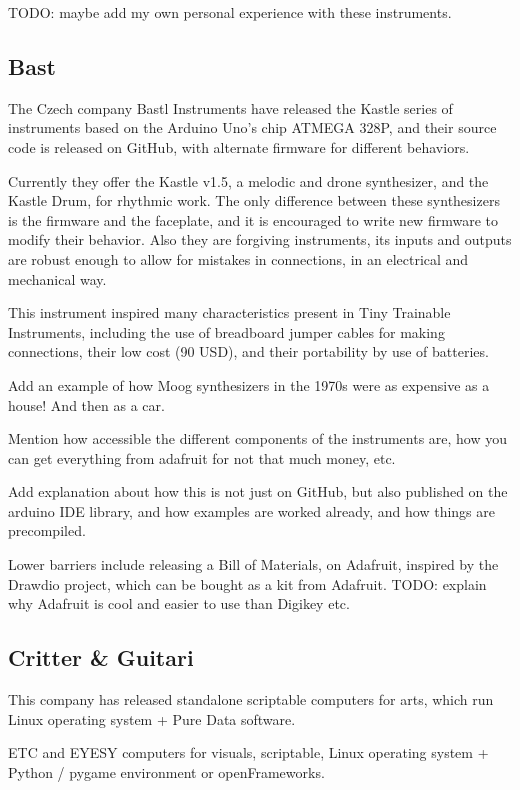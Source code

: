 TODO: maybe add my own personal experience with these instruments.

\subsection{Bast}

The Czech company Bastl Instruments have released the Kastle series of instruments based on the Arduino Uno’s chip ATMEGA 328P, and their source code is released on GitHub, with alternate firmware for different behaviors.

Currently they offer the Kastle v1.5, a melodic and drone synthesizer, and the Kastle Drum, for rhythmic work. The only difference between these synthesizers is the firmware and the faceplate, and it is encouraged to write new firmware to modify their behavior. Also they are forgiving instruments, its inputs and outputs are robust enough to allow for mistakes in connections, in an electrical and mechanical way.

This instrument inspired many characteristics present in Tiny Trainable Instruments, including 
 the use of breadboard jumper cables for making connections, their low cost (90 USD), and their portability by use of batteries.

Add an example of how Moog synthesizers in the 1970s were as expensive as a house!
And then as a car.

Mention how accessible the different components of the instruments are, how you can get everything from adafruit for not that much money, etc.

Add explanation about how this is not just on GitHub, but also published on the arduino IDE library, and how examples are worked already, and how things are precompiled.

Lower barriers include releasing a Bill of Materials, on Adafruit, inspired by the Drawdio project, which can be bought as a kit from Adafruit. TODO: explain why Adafruit is cool and easier to use than Digikey etc.

\subsection{Critter \& Guitari}

This company has released standalone scriptable computers for arts, which run Linux operating system + Pure Data software.

ETC and EYESY computers for visuals, scriptable, Linux operating system + Python / pygame environment or openFrameworks.

